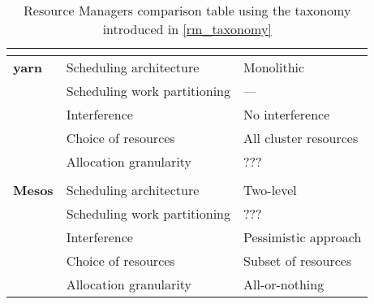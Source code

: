 \begin{table}[h]
\begin{center}
\begin{tabular}{lll}
\multicolumn{3}{c}{} \\ \hline
\multicolumn{1}{l|}{\textbf{\glsdesc{yarn}}} 
                                   & Scheduling architecture      & Monolithic              \\ \cline{2-3} 
\multicolumn{1}{l|}{}              & Scheduling work partitioning & ---                     \\ \cline{2-3} 
\multicolumn{1}{l|}{}              & Interference                 & No interference         \\ \cline{2-3} 
\multicolumn{1}{l|}{}              & Choice of resources          & All cluster resources   \\ \cline{2-3} 
\multicolumn{1}{l|}{}              & Allocation granularity       & ???                     \\ \cline{2-3}

\multicolumn{3}{c}{} \\ \hline
\multicolumn{1}{l|}{\textbf{Mesos \cite{mesos}}} 
                                   & Scheduling architecture      & Two-level               \\ \cline{2-3} 
\multicolumn{1}{l|}{}              & Scheduling work partitioning & ???                     \\ \cline{2-3} 
\multicolumn{1}{l|}{}              & Interference                 & Pessimistic approach    \\ \cline{2-3} 
\multicolumn{1}{l|}{}              & Choice of resources          & Subset of resources     \\ \cline{2-3} 
\multicolumn{1}{l|}{}              & Allocation granularity       & All-or-nothing                    

\end{tabular}
\end{center}
\caption{Resource Managers comparison table using the taxonomy introduced in \autoref{rm_taxonomy}}
\label{rm-comparison-table}
\end{table}

